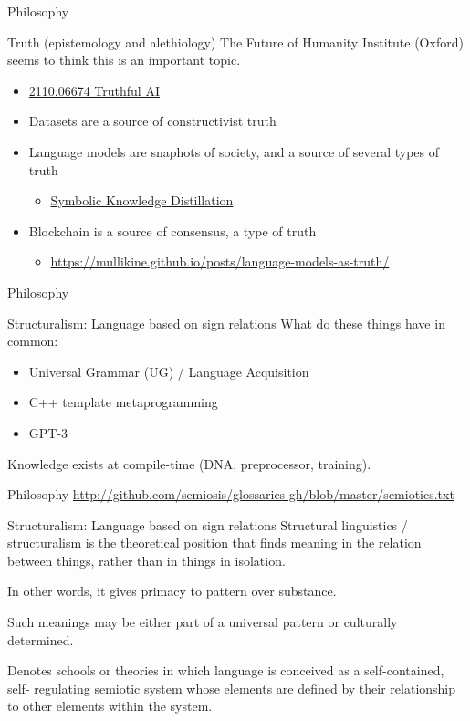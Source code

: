 \documentclass[presentation]{beamer}
\begin{document}
\begin{frame}[label={sec:orgb76d799}]{Philosophy}
\begin{block}{Truth (epistemology and alethiology)}
The Future of Humanity Institute (Oxford)
seems to think this is an important topic.

\begin{itemize}
\item \href{https://arxiv.org/abs/2110.06674}{ 2110.06674  Truthful AI}
\item Datasets are a source of constructivist truth
\item Language models are snaphots of society, and a source of several types of truth
\begin{itemize}
\item \href{https://www.youtube.com/watch?v=kP-dXK9JEhY}{Symbolic Knowledge Distillation}
\end{itemize}
\item Blockchain is a source of consensus, a type of truth
\begin{itemize}
\item \url{https://mullikine.github.io/posts/language-models-as-truth/}
\end{itemize}
\end{itemize}
\end{block}
\end{frame}

\begin{frame}[label={sec:org377ea6b}]{Philosophy}
\begin{block}{Structuralism: Language based on sign relations}
What do these things have in common:
\begin{itemize}
\item Universal Grammar (UG) / Language Acquisition
\item C++ template metaprogramming
\item GPT-3
\end{itemize}

Knowledge exists at compile-time (DNA, preprocessor, training).
\end{block}
\end{frame}

\begin{frame}[label={sec:org96094a5}]{Philosophy}
\url{http://github.com/semiosis/glossaries-gh/blob/master/semiotics.txt}

\begin{block}{Structuralism: Language based on sign relations}
Structural linguistics / structuralism is the
theoretical position that finds meaning in the
relation between things, rather than in things
in isolation.

In other words, it gives primacy to pattern
over substance.

Such meanings may be either part of a
universal pattern or culturally determined.

Denotes schools or theories in which language
is conceived as a self-contained, self-
regulating semiotic system whose elements are
defined by their relationship to other
elements within the system.
\end{block}
\end{frame}
\end{document}
